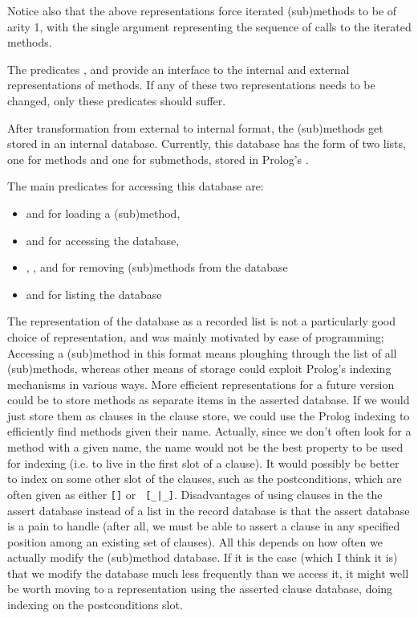 Notice also that the above representations force iterated (sub)methods
to be of arity 1, with the single argument representing the sequence of
calls to the iterated methods.

The predicates ,  and  provide
an interface to the internal and external representations of methods.
If any of these two representations needs to be changed, only these
predicates should suffer.

After transformation from external to internal format, the
(sub)methods get stored in an internal database. Currently, this
database has the form of two lists, one for methods and one for
submethods, stored in Prolog's .

The main predicates for accessing this database are:
\begin{itemize}
\item {} and  for loading a
(sub)method,

\item {} and  for accessing the database,
\item {}, ,
 and  for removing (sub)methods from
the database 
\item {} and  for listing the database
\end{itemize}

The representation of the database as a recorded list is not a
\notnice particularly good choice of representation, and was mainly
motivated by ease of programming; Accessing a (sub)method in this
format means ploughing through the list of all (sub)methods, whereas
other means of storage could exploit Prolog's indexing mechanisms in
various ways.  More efficient representations for a future version
could be to store methods as separate items in the asserted
database. If we would just store them as  clauses in the
clause store, we could use the Prolog indexing to efficiently find
methods given their name.  Actually, since we don't often look for a
method with a given name, the name would not be the best property to
be used for indexing (i.e.  to live in the first slot of a
 clause). It would possibly be better to index on some
other slot of the  clauses, such as the postconditions,
which are often given as either {\tt []} or {\tt
[\_|\_]}. Disadvantages of using clauses in the the assert database
instead of a list in the record database is that the assert database
is a pain to handle (after all, we must be able to assert a clause in
any specified position among an existing set of clauses). All this
depends on how often we actually modify the (sub)method database. If
it is the case (which I think it is) that we modify the database much
less frequently than we access it, it might well be worth moving to a
representation using the asserted clause database, doing indexing on
the postconditions slot.



